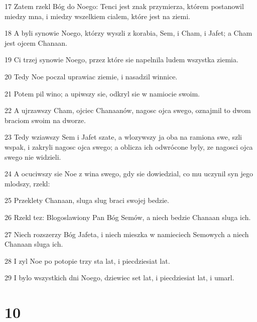 \par 17 Zatem rzekl Bóg do Noego: Tenci jest znak przymierza, którem postanowil miedzy mna, i miedzy wszelkiem cialem, które jest na ziemi.
\par 18 A byli synowie Noego, którzy wyszli z korabia, Sem, i Cham, i Jafet; a Cham jest ojcem Chanaan.
\par 19 Ci trzej synowie Noego, przez które sie napelnila ludem wszystka ziemia.
\par 20 Tedy Noe poczal uprawiac ziemie, i nasadzil winnice.
\par 21 Potem pil wino; a upiwszy sie, odkryl sie w namiocie swoim.
\par 22 A ujrzawszy Cham, ojciec Chanaanów, nagosc ojca swego, oznajmil to dwom braciom swoim na dworze.
\par 23 Tedy wziawszy Sem i Jafet szate, a wlozywszy ja oba na ramiona swe, szli wspak, i zakryli nagosc ojca swego; a oblicza ich odwrócone byly, ze nagosci ojca swego nie widzieli.
\par 24 A ocuciwszy sie Noe z wina swego, gdy sie dowiedzial, co mu uczynil syn jego mlodszy, rzekl:
\par 25 Przeklety Chanaan, sluga slug braci swojej bedzie.
\par 26 Rzekl tez: Blogoslawiony Pan Bóg Semów, a niech bedzie Chanaan sluga ich.
\par 27 Niech rozszerzy Bóg Jafeta, i niech mieszka w namieciech Semowych a niech Chanaan sluga ich.
\par 28 I zyl Noe po potopie trzy sta lat, i piecdziesiat lat.
\par 29 I bylo wszystkich dni Noego, dziewiec set lat, i piecdziesiat lat, i umarl.

\chapter{10}

